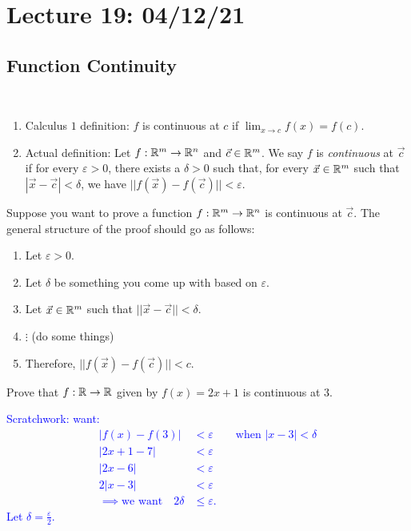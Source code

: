 \section{Lecture 19: 04/12/21}

\subsection{Function Continuity}

\begin{definition}\
\quad
\begin{enumerate}
    \item Calculus $1$ definition: $f$ is continuous at $c$ if $\lim_{x \to c} f(x) = f(c)$.
    \item Actual definition: Let $f: \mathbb{R}^m \to \mathbb{R}^n$ and $\vec c \in \mathbb{R}^m$. We say $f$ is \textit{continuous} at $\vec c$ if for every $\varepsilon>0$, there exists a $\delta>0$ such that, for every $\vec{x}\in \mathbb{R}^m$ such that $|\vec{x}-\vec{c}| <\delta$, we have $||f(\vec x) - f(\vec c)|| < \varepsilon$.
\end{enumerate}
\end{definition}

\begin{example}
Suppose you want to prove a function $f: \mathbb{R}^m \to \mathbb{R}^n$ is continuous at $\vec c$. The general structure of the proof should go as follows:
\begin{enumerate}
    \item Let $\varepsilon > 0$.
    \item Let $\delta$ be something you come up with based on $\varepsilon$.
    \item Let $\vec x \in \mathbb{R}^m$ such that $||\vec x - \vec c|| < \delta$. 
    \item $\vdots$ (do some things)
    \item Therefore, $||f(\vec x) - f(\vec c) || < c$.
\end{enumerate}
\end{example}

\begin{example}
Prove that $f : \mathbb{R} \to \mathbb{R}$ given by $f(x) = 2x + 1$ is continuous at $3$.
\end{example}

\textcolor{blue}{
Scratchwork: want:
\begin{align*}
    |f(x) - f(3)| &< \varepsilon \qquad \text{when } |x - 3| < \delta \\
    |2x+1 - 7| &< \varepsilon \\
    |2x - 6| &< \varepsilon \\
    2|x - 3| &< \varepsilon \\
    \implies \text{we want}\quad 2\delta &\le \varepsilon.
\end{align*}
Let $\delta = \frac \varepsilon 2$.
}

